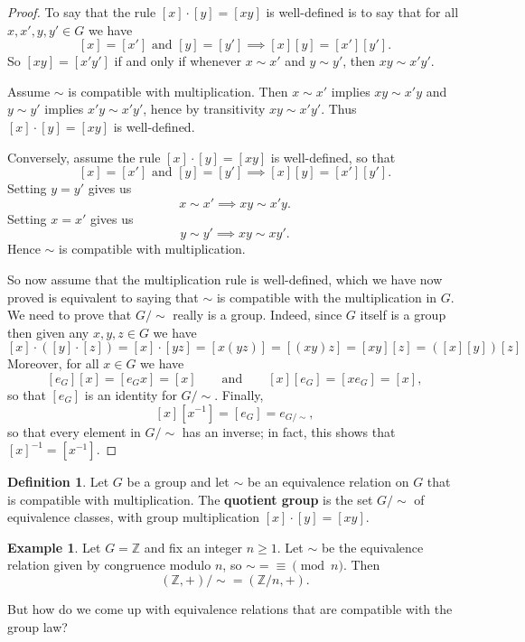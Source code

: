 \documentclass[12pt]{report}
\numberwithin{equation}{section}
\numberwithin{theorem}{chapter}
\theoremstyle{definition}
\newtheorem{definition}[theorem]{Definition}
\newtheorem{example}[theorem]{Example}
\newtheorem*{basic properties}{Basic Properties}
\newtheorem*{Important Remark}{Important Remark}
\newcommand{\df}[1]{{\bf #1}\index{#1}}
\begin{document}
\begin{proof} 
To say that the rule $[x] \cdot [y] = [xy]$ is well-defined is to say that for all $x, x', y, y' \in G$ we have
$$[x]=[x'] \textrm{ and } [y]=[y'] \implies [x][y]=[x'][y'].$$ 
So $[xy]=[x'y']$ if and only if whenever $x\sim x'$ and $y\sim y'$, then $xy\sim x'y'$.

Assume $\sim$ is compatible with multiplication. Then $x\sim x'$ implies $xy\sim x'y$ and $y\sim y'$ implies $x'y\sim x'y'$, hence by transitivity $xy\sim x'y'$. Thus $[x] \cdot [y] = [xy]$ is well-defined.

Conversely, assume the rule $[x] \cdot [y] = [xy]$ is well-defined, so that
$$[x]=[x'] \textrm{ and } [y]=[y'] \implies [x][y]=[x'][y'].$$ 
Setting $y=y'$ gives us
$$x\sim x' \implies xy\sim x'y.$$ 
Setting $x=x'$ gives us 
$$y\sim y' \implies xy\sim xy'.$$ 
Hence $\sim$ is compatible with multiplication.



So now assume that the multiplication rule is well-defined, which we have now proved is equivalent to saying that $\sim$ is compatible with the multiplication in $G$. We need to prove that $G/\sim$ really is a group. Indeed, since $G$ itself is a group then given any $x,y,z \in G$ we have 
$$[x] \cdot ([y] \cdot [z]) = [x] \cdot [yz] = [x(yz)] = [(xy)z] = [xy][z] = ([x][y])[z]$$ 
Moreover, for all $x \in G$ we have
$$[e_G] [x] = [e_G x] = [x] \qquad \textrm{and} \qquad  [x] [e_G] = [x e_G] = [x],$$ 
so that $[e_G]$ is an identity for $G/\sim$. Finally,
$$[x][x^{-1}] = [e_G] = e_{G/\sim},$$ 
so that every element in $G/\sim$ has an inverse; in fact, this shows that $[x]^{-1} = [x^{-1}]$. 
\end{proof}


\begin{definition}
Let $G$ be a group and let $\sim$ be an equivalence relation on $G$ that is compatible with multiplication. The \df{quotient group} is the set $G/\sim$ of equivalence classes, with group multiplication $[x]\cdot [y] = [xy]$. 
\end{definition}


\begin{example}
Let $G=\mathbb{Z}$ and fix an integer $n \geqslant 1$. Let $\sim$ be the equivalence relation given by congruence modulo $n$, so $\sim = \equiv \pmod n$. Then 
$$(\mathbb{Z},+)/\sim = (\mathbb{Z}/n,+).$$
\end{example}


But how do we come up with equivalence relations that are compatible with the group law?
\end{document}
